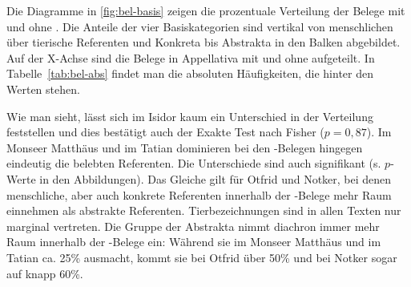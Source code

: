 Die Diagramme in \ref{fig:bel-basis} zeigen die prozentuale Verteilung der Belege mit und ohne  . Die Anteile der vier Basiskategorien sind vertikal von menschlichen über tierische Referenten und Konkreta bis Abstrakta in den Balken abgebildet. Auf der X-Achse sind die Belege in Appellativa mit   und ohne   aufgeteilt.  In Tabelle~\ref{tab:bel-abs} findet man die absoluten Häufigkeiten, die hinter den Werten stehen.

Wie man sieht, lässt sich im Isidor kaum ein Unterschied in der Verteilung feststellen und dies bestätigt auch der Exakte Test nach Fisher ($p = 0,87$). Im Monseer Matthäus und im Tatian dominieren bei den -Belegen hingegen eindeutig die belebten Referenten. Die Unterschiede sind auch signifikant (s. $p$-Werte in den Abbildungen). Das Gleiche gilt für Otfrid und Notker, bei denen menschliche, aber auch konkrete Referenten innerhalb der -Belege mehr Raum einnehmen als abstrakte Referenten. Tierbezeichnungen sind in allen Texten nur marginal vertreten. Die Gruppe der Abstrakta nimmt diachron immer mehr Raum innerhalb der -Belege ein: Während sie im Monseer Matthäus und im Tatian ca. 25\% ausmacht, kommt sie bei Otfrid über 50\% und bei Notker sogar auf knapp 60\%. 

